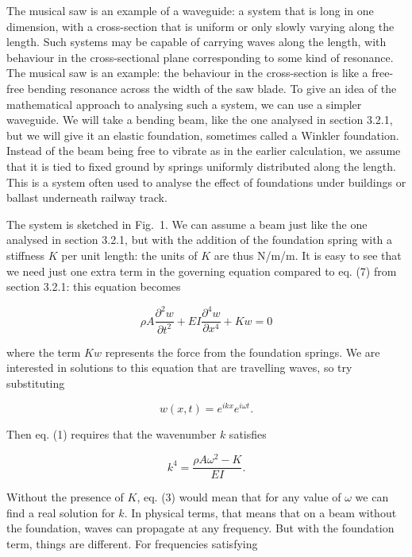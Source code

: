   The musical saw is an example of a waveguide: a system that is long in one 
  dimension, with a cross-section that is uniform or only slowly varying along 
  the length. Such systems may be capable of carrying waves along the length, 
  with behaviour in the cross-sectional plane corresponding to some kind of 
  resonance. The musical saw is an example: the behaviour in the cross-section 
  is like a free-free bending resonance across the width of the saw blade. To 
  give an idea of the mathematical approach to analysing such a system, we can 
  use a simpler waveguide. We will take a bending beam, like the one analysed 
  in section 3.2.1, but we will give it an elastic foundation, sometimes called 
  a Winkler foundation. Instead of the beam being free to vibrate as in the 
  earlier calculation, we assume that it is tied to fixed ground by springs 
  uniformly distributed along the length. This is a system often used to 
  analyse the effect of foundations under buildings or ballast underneath 
  railway track. 


  The system is sketched in Fig.\ 1. We can assume a beam just like the one 
  analysed in section 3.2.1, but with the addition of the foundation spring 
  with a stiffness $K$ per unit length: the units of $K$ are thus N/m/m. It is 
  easy to see that we need just one extra term in the governing equation 
  compared to eq. (7) from section 3.2.1: this equation becomes 

  $$\rho A \dfrac{\partial^2 w}{\partial t^2}+EI \dfrac{\partial^4 w}{\partial 
  x^4} + K w=0\tag{1}$$ 

  where the term $Kw$ represents the force from the foundation springs. We are 
  interested in solutions to this equation that are travelling waves, so try 
  substituting 

  $$w(x,t) = e^{i k x} e^{i \omega t} .\tag{2}$$ 

  Then eq. (1) requires that the wavenumber $k$ satisfies 

  $$k^4 = \dfrac{\rho A \omega^2 -K}{EI} . \tag{3}$$ 

  Without the presence of $K$, eq. (3) would mean that for any value of 
  $\omega$ we can find a real solution for $k$. In physical terms, that means 
  that on a beam without the foundation, waves can propagate at any frequency. 
  But with the foundation term, things are different. For frequencies 
  satisfying 

